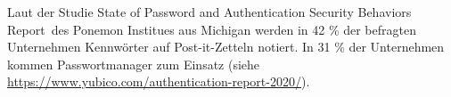 \begin{frame}
\begin{itemize}
  
  
\end{itemize}

Laut der Studie \glqq State of Password and Authentication Security Behaviors Report\grqq\ des Ponemon Institues aus Michigan werden in 42 \% der befragten Unternehmen Kennwörter auf Post-it-Zetteln notiert. In 31 \% der Unternehmen kommen Passwortmanager zum Einsatz (siehe \href{https://www.yubico.com/authentication-report-2020/}{https://www.yubico.com/authentication-report-2020/}).
\end{frame}